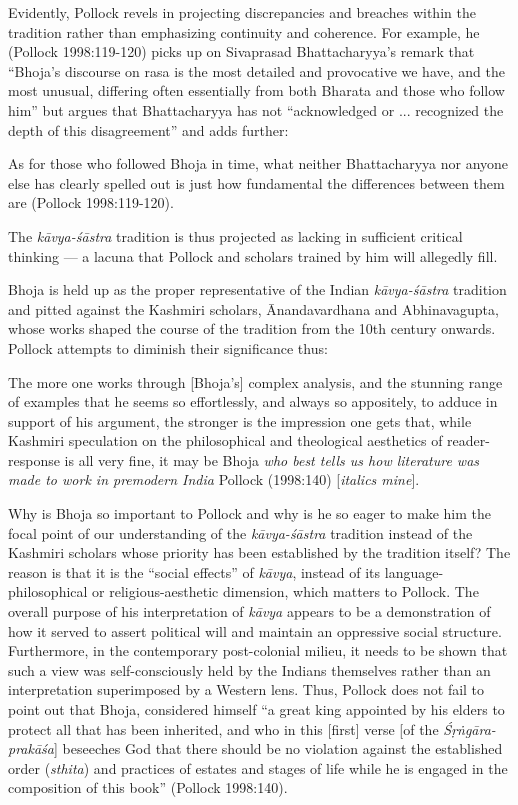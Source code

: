 Evidently, Pollock revels in projecting discrepancies and breaches with\-in the tradition rather than emphasizing continuity and coherence. For example, he (Pollock 1998:119-120) picks up on Sivaprasad Bhattacharyya's remark that ``Bhoja's discourse on rasa is the most detailed and provocative we have, and the most unusual, differing often essentially from both Bharata and those who follow him'' but argues that Bhattacharyya has not ``acknowledged or ... recognized the depth of this disagreement'' and adds further:

\begin{myquote}
As for those who followed Bhoja in time, what neither Bhattacharyya nor anyone else has clearly spelled out is just how fundamental the differences between them are 
\hfill (Pollock 1998:119-120).  
\end{myquote}

The {\sl kāvya-śāstra} tradition is thus projected as lacking in sufficient critical thinking --- a lacuna that Pollock and scholars trained by him will allegedly fill.

Bhoja is held up as the proper representative of the Indian {\sl kāvya-śāstra} tradition and pitted against the Kashmiri scholars, Ānandavardhana and Abhinavagupta, whose works shaped the course of the tradition from the 10th century onwards. Pollock attempts to diminish their significance thus:

\begin{myquote}
The more one works through [Bhoja's] complex analysis, and the stunning range of examples that he seems so effortlessly, and always so appositely, to adduce in support of his argument, the stronger is the impression one gets that, while Kashmiri speculation on the philosophical and theological aesthetics of reader-response is all very fine, it may be Bhoja {\sl who best tells us how literature was made to work in premodern India} 
\hfill Pollock (1998:140) [{\sl italics mine}].
\end{myquote}

Why is Bhoja so important to Pollock and why is he so eager to make him the focal point of our understanding of the {\sl kāvya-śāstra} tradition instead of the Kashmiri scholars whose priority has been established by the tradition itself? The reason is that it is the ``social effects'' of {\sl kāvya}, instead of its language-philosophical or religious-aesthetic dimension, which matters to Pollock. The overall purpose of his interpretation of {\sl kāvya} appears to be a demonstration of how it served to assert political will and maintain an oppressive social structure. Furthermore, in the contemporary post-colonial milieu, it needs to be shown that such a view was self-consciously held by the Indians themselves rather than an interpretation superimposed by a Western lens. Thus, Pollock does not fail to point out that Bhoja, considered himself ``a great king appointed by his elders to protect all that has been inherited, and who in this [first] verse [of the {\sl Śṛṅgāra-prakāśa}] beseeches God that there should be no violation against the established order ({\sl sthita}) and practices of estates and stages of life while he is engaged in the composition of this book'' (Pollock 1998:140).

